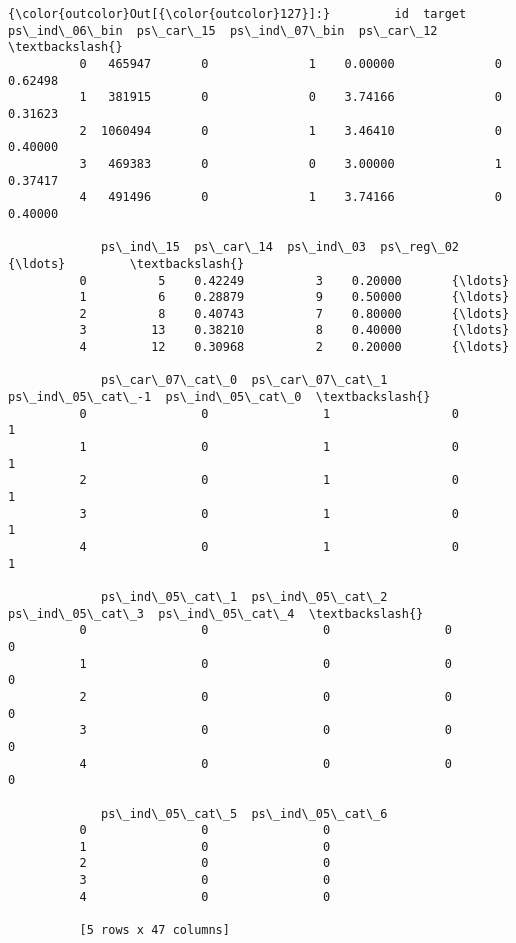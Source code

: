 \documentclass[11pt]{article}
\begin{document}
\begin{Verbatim}[commandchars=\\\{\}]
{\color{outcolor}Out[{\color{outcolor}127}]:}         id  target  ps\_ind\_06\_bin  ps\_car\_15  ps\_ind\_07\_bin  ps\_car\_12  \textbackslash{}
          0   465947       0              1    0.00000              0    0.62498   
          1   381915       0              0    3.74166              0    0.31623   
          2  1060494       0              1    3.46410              0    0.40000   
          3   469383       0              0    3.00000              1    0.37417   
          4   491496       0              1    3.74166              0    0.40000   
          
             ps\_ind\_15  ps\_car\_14  ps\_ind\_03  ps\_reg\_02       {\ldots}         \textbackslash{}
          0          5    0.42249          3    0.20000       {\ldots}          
          1          6    0.28879          9    0.50000       {\ldots}          
          2          8    0.40743          7    0.80000       {\ldots}          
          3         13    0.38210          8    0.40000       {\ldots}          
          4         12    0.30968          2    0.20000       {\ldots}          
          
             ps\_car\_07\_cat\_0  ps\_car\_07\_cat\_1  ps\_ind\_05\_cat\_-1  ps\_ind\_05\_cat\_0  \textbackslash{}
          0                0                1                 0                1   
          1                0                1                 0                1   
          2                0                1                 0                1   
          3                0                1                 0                1   
          4                0                1                 0                1   
          
             ps\_ind\_05\_cat\_1  ps\_ind\_05\_cat\_2  ps\_ind\_05\_cat\_3  ps\_ind\_05\_cat\_4  \textbackslash{}
          0                0                0                0                0   
          1                0                0                0                0   
          2                0                0                0                0   
          3                0                0                0                0   
          4                0                0                0                0   
          
             ps\_ind\_05\_cat\_5  ps\_ind\_05\_cat\_6  
          0                0                0  
          1                0                0  
          2                0                0  
          3                0                0  
          4                0                0  
          
          [5 rows x 47 columns]
\end{Verbatim}
            
\end{document}
